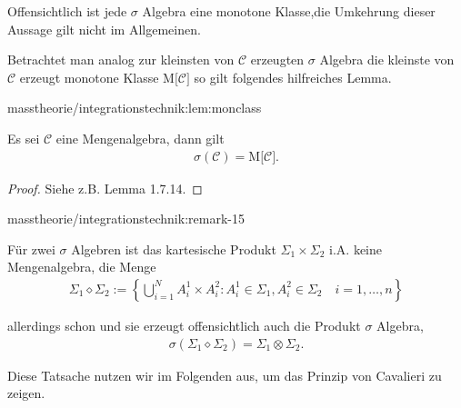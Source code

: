 \par
Offensichtlich ist jede \(\sigma\) Algebra eine monotone Klasse,die Umkehrung dieser Aussage gilt nicht im Allgemeinen.

\par
Betrachtet man analog zur kleinsten von \(\mathcal{C}\) erzeugten \(\sigma\) Algebra die kleinste von \(\mathcal{C}\) erzeugt monotone Klasse \(\text{M}\big[\mathcal{C}\big]\) so gilt folgendes hilfreiches Lemma.
\begin{lemma}{}{masstheorie/integrationstechnik:lem:monclass}



\par
Es sei \(\mathcal{C}\) eine Mengenalgebra, dann gilt
\begin{align*}
\sigma(\mathcal{C}) = \text{M}\big[\mathcal{C}\big].
\end{align*}\end{lemma}

\begin{proof}
 Siehe z.B. \cite{Tao07} Lemma 1.7.14.
\end{proof}
\begin{remark}{}{masstheorie/integrationstechnik:remark-15}



\par
Für zwei \(\sigma\) Algebren ist das kartesische Produkt \(\Sigma_1\times\Sigma_2\) i.A. keine Mengenalgebra, die Menge
\begin{align*}
\Sigma_1\diamond\Sigma_2:= \left\{\bigcup_{i=1}^N A^1_i\times A^2_i: A^1_i\in\Sigma_1, A^2_i\in\Sigma_2\quad i=1,\ldots,n\right\}
\end{align*}
\par
allerdings schon und sie erzeugt offensichtlich auch die Produkt \(\sigma\) Algebra,
\begin{align*}
\sigma(\Sigma_1\diamond\Sigma_2) = \Sigma_1\otimes\Sigma_2.
\end{align*}
\par
Diese Tatsache nutzen wir im Folgenden aus, um das Prinzip von Cavalieri zu zeigen.
\end{remark}

